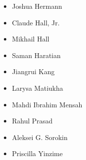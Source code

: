 \begin{itemize}
	\item Joshua Hermann
	\item Claude Hall, Jr.
	\item Mikhail Hall
	\item Saman Haratian
	\item Jiangrui Kang
	\item Larysa Matiukha
	\item Mahdi Ibrahim Mensah
	\item Rahul Prasad
	\item Aleksei G. Sorokin
	\item Priscilla Yinzime
\end{itemize}
